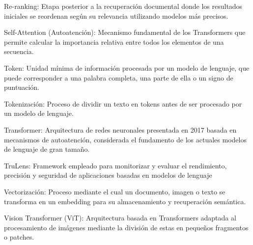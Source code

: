 Re-ranking: Etapa posterior a la recuperación documental donde los resultados iniciales se reordenan según su relevancia utilizando modelos más precisos.

Self-Attention (Autoatención): Mecanismo fundamental de los Transformers que permite calcular la importancia relativa entre todos los elementos de una secuencia.

Token: Unidad mínima de información procesada por un modelo de lenguaje, que puede corresponder a una palabra completa, una parte de ella o un signo de puntuación.

Tokenización: Proceso de dividir un texto en tokens antes de ser procesado por un modelo de lenguaje.

Transformer: Arquitectura de redes neuronales presentada en 2017 basada en mecanismos de autoatención, considerada el fundamento de los actuales modelos de lenguaje de gran tamaño.

TruLens: Framework empleado para monitorizar y evaluar el rendimiento, precisión y seguridad de aplicaciones basadas en modelos de lenguaje

Vectorización: Proceso mediante el cual un documento, imagen o texto se transforma en un embedding para su almacenamiento y recuperación semántica.

Vision Transformer (ViT): Arquitectura basada en Transformers adaptada al procesamiento de imágenes mediante la división de estas en pequeños fragmentos o patches.



